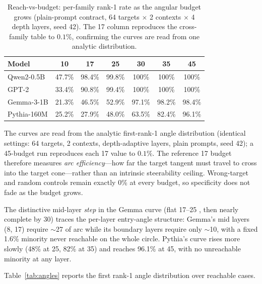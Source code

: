 \documentclass{article}
\begin{document}
\begin{table}[h]
\centering
\begin{tabular}{lcccccc}
\toprule
Model & 10\textdegree{} & 17\textdegree{} & 25\textdegree{} & 30\textdegree{} & 35\textdegree{} & 45\textdegree{} \\
\midrule
Qwen2-0.5B & 47.7\% & 98.4\% & 99.8\% & 100\% & 100\% & 100\% \\
GPT-2 & 33.4\% & 90.8\% & 99.4\% & 100\% & 100\% & 100\% \\
Gemma-3-1B & 21.3\% & 46.5\% & 52.9\% & 97.1\% & 98.2\% & 98.4\% \\
Pythia-160M & 25.2\% & 27.9\% & 48.0\% & 63.5\% & 82.4\% & 96.1\% \\
\bottomrule
\end{tabular}
\caption{Reach-vs-budget: per-family rank-1 rate as the angular budget grows
(plain-prompt contract, 64 targets $\times$ 2 contexts $\times$ 4 depth layers,
seed 42). The 17\textdegree{} column reproduces the cross-family table to
$0.1\%$, confirming the curves are read from one analytic distribution.}
\label{tab:reachbudget}
\end{table}

The curves are read from the analytic first-rank-1 angle distribution (identical
settings: 64 targets, 2 contexts, depth-adaptive layers, plain prompts, seed
42); a 45\textdegree{}-budget run reproduces each 17\textdegree{} value to
$0.1\%$. The reference 17\textdegree{} budget therefore measures \emph{arc
efficiency}---how far the target tangent must travel to cross into the target
cone---rather than an intrinsic steerability ceiling. Wrong-target and random
controls remain exactly 0\% at every budget, so specificity does not fade as
the budget grows.

The distinctive mid-layer \emph{step} in the Gemma curve (flat 17--25
\textdegree{}, then nearly complete by 30\textdegree{}) traces the per-layer
entry-angle structure: Gemma's mid layers (8, 17) require $\sim$27\textdegree{}
of arc while its boundary layers require only $\sim$10\textdegree{}, with a
fixed 1.6\% minority never reachable on the whole circle. Pythia's curve rises
more slowly (48\% at 25\textdegree{}, 82\% at 35\textdegree{}) and reaches
96.1\% at 45\textdegree{}, with no unreachable minority at any layer.

Table~\ref{tab:angles} reports the first rank-1 angle distribution over
reachable cases.
\end{document}
